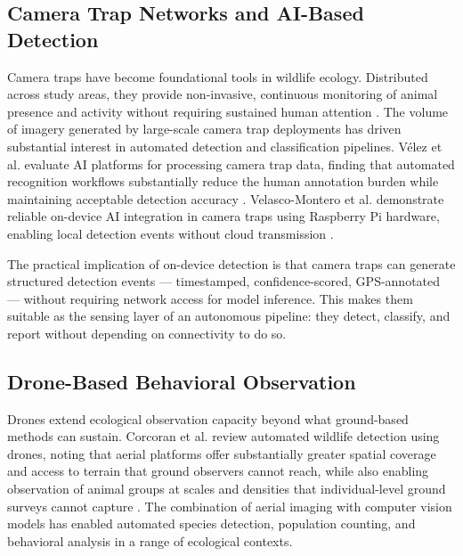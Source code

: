 \subsection{Camera Trap Networks and AI-Based Detection}
\label{sec:camera_trap}
Camera traps have become foundational tools in wildlife ecology\cite{burton2015cameratrap}. Distributed across study areas, they provide non-invasive, continuous monitoring of animal presence and activity without requiring sustained human attention \cite{corcoran2021automated}. The volume of imagery generated by large-scale camera trap deployments has driven substantial interest in automated detection and classification pipelines. Vélez et al. evaluate AI platforms for processing camera trap data, finding that automated recognition workflows substantially reduce the human annotation burden while maintaining acceptable detection accuracy \cite{velez2023evaluation}. Velasco-Montero et al. demonstrate reliable on-device AI integration in camera traps using Raspberry Pi hardware, enabling local detection events without cloud transmission \cite{velascomontero2024reliable}.

The practical implication of on-device detection is that camera traps can generate structured detection events — timestamped, confidence-scored, GPS-annotated — without requiring network access for model inference. This makes them suitable as the sensing layer of an autonomous pipeline: they detect, classify, and report without depending on connectivity to do so.
\subsection{Drone-Based Behavioral Observation}
\label{sec:drone_based}
Drones extend ecological observation capacity beyond what ground-based methods can sustain. Corcoran et al. review automated wildlife detection using drones, noting that aerial platforms offer substantially greater spatial coverage and access to terrain that ground observers cannot reach, while also enabling observation of animal groups at scales and densities that individual-level ground surveys cannot capture \cite{corcoran2021automated}. The combination of aerial imaging with computer vision models has enabled automated species detection, population counting, and behavioral analysis in a range of ecological contexts.

